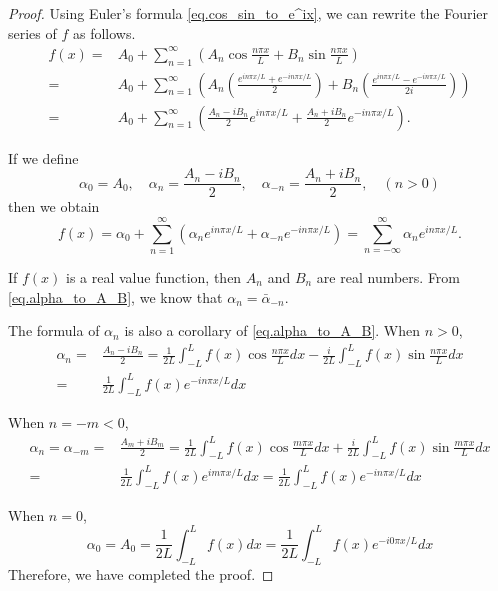 \begin{proof}
Using Euler's formula \eqref{eq.cos_sin_to_e^ix}, we can rewrite the Fourier series of $f$ as follows.
$$
\begin{aligned}
    f(x)=&A_0+\sum_{n=1}^{\infty}\left(A_n \cos \frac{n \pi x}{L}+B_n \sin \frac{n \pi x}{L}\right)
    \\
    =& A_0+\sum_{n=1}^{\infty}\left(A_n \left(\frac{e^{i n \pi x / L} + e^{-i n \pi x / L}}{2}\right)+B_n \left(\frac{e^{i n \pi x / L} - e^{-i n \pi x / L}}{2i}\right)\right)
    \\
    =&A_0+\sum_{n=1}^{\infty}\left(\frac{A_n-i B_n}{2} e^{i n \pi x / L}+\frac{A_n+i B_n}{2} e^{-i n \pi x / L}\right) .
\end{aligned}
$$

If we define
\begin{equation}\label{eq.alpha_to_A_B}
    \alpha_0=A_0, \quad \alpha_n=\frac{A_n-i B_n}{2}, \quad \alpha_{-n}=\frac{A_n+i B_n}{2}, \quad(n>0)
\end{equation}
then we obtain
$$
f(x)=\alpha_0+\sum_{n=1}^{\infty}\left(\alpha_n e^{i n \pi x / L}+\alpha_{-n} e^{-i n \pi x / L}\right)=\sum_{n=-\infty}^{\infty} \alpha_n e^{i n \pi x / L} .
$$

If $f(x)$ is a real value function, then $A_n$ and $B_n$ are real numbers. From \eqref{eq.alpha_to_A_B}, we know that $\alpha_n = \bar{\alpha}_{-n}$.

The formula of $\alpha_n$ is also a corollary of \eqref{eq.alpha_to_A_B}. When $n > 0$,
$$
\begin{aligned}
    \alpha_n =& \frac{A_n-i B_n}{2} = \frac{1}{2L} \int_{-L}^L f(x) \cos \frac{n \pi x}{L} d x -  \frac{i}{2L} \int_{-L}^L f(x) \sin \frac{n \pi x}{L} d x 
    \\
    =& \frac{1}{2 L} \int_{-L}^L f(x) e^{-i n \pi x / L} d x
\end{aligned}
$$

When $n = -m < 0$,
$$
\begin{aligned}
    \alpha_n = \alpha_{-m} =& \frac{A_{m}+i B_{m}}{2} = \frac{1}{2L} \int_{-L}^L f(x) \cos \frac{m \pi x}{L} d x + \frac{i}{2L} \int_{-L}^L f(x) \sin \frac{m \pi x}{L} d x 
    \\
    =& \frac{1}{2 L} \int_{-L}^L f(x) e^{i m \pi x / L} d x = \frac{1}{2 L} \int_{-L}^L f(x) e^{- i n \pi x / L} d x
\end{aligned}
$$

When $n = 0$,
$$
\alpha_0 = A_0 = \frac{1}{2L} \int_{-L}^L f(x) d x = \frac{1}{2 L} \int_{-L}^L f(x) e^{- i 0 \pi x / L} d x
$$
Therefore, we have completed the proof.
\end{proof}

